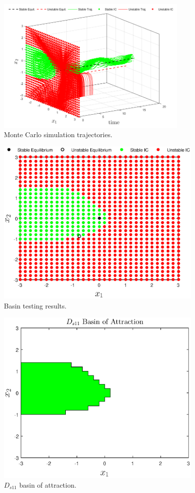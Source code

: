 \documentclass[12pt]{article}
\begin{document}
\begin{figure}[H]
\begin{center}
\includegraphics[width=3.7in]{basinMDMP_11_1.png}
\caption{Monte Carlo simulation trajectories.}
\label{basinMDMP_11_1}
\end{center}
\end{figure}
\vspace{-.3in}
\begin{figure}[H]
\begin{center}
\includegraphics[width=4in]{basinMDMP_11_2.eps}
\caption{Basin testing results.}
\label{basinMDMP_11_2}
\end{center}
\end{figure}

\begin{figure}[H]
\begin{center}
\includegraphics[width=4in]{Ds11_basin.eps}
\caption{$D_{s11}$ basin of attraction.}
\label{Ds11_basin}
\end{center}
\end{figure}
\end{document}
